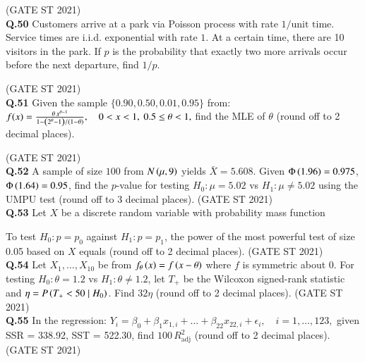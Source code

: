 \documentclass[journal,12pt,onecolumn]{IEEEtran}
\theoremstyle{remark}
\begin{document}
\hfill (GATE ST 2021) \\

\textbf{Q.50}
Customers arrive at a park via Poisson process with rate $1/\text{unit time}$.  
Service times are i.i.d. exponential with rate $1$. At a certain time, there are 10 visitors in the park.  
If $p$ is the probability that exactly two more arrivals occur before the next departure, find $1/p$.

\hfill (GATE ST 2021) \\

\textbf{Q.51}
Given the sample $\{0.90, 0.50, 0.01, 0.95 \}$ from:
$
f(x) = \frac{\theta\, x^{\theta - 1}}{1 - \left(2^{\theta} - 1\right)/\left(1- \theta\right)}, \quad 0 < x < 1, \ 0.5 \le \theta < 1,
$
find the MLE of $\theta$ (round off to 2 decimal places).

\hfill (GATE ST 2021) \\
\textbf{Q.52}
A sample of size $100$ from $N\left(\mu,9\right)$ yields $\bar{X} = 5.608$.  
Given $\Phi\left(1.96\right)= 0.975$, $\Phi\left(1.64\right) = 0.95$,  
find the $p$-value for testing $H_0: \mu = 5.02$ vs $H_1: \mu \neq 5.02$ using the UMPU test  
(round off to 3 decimal places).
\hfill (GATE ST 2021) \\
\textbf{Q.53}
Let $X$ be a discrete random variable with probability mass function

  \bigskip

To test $H_0: p = p_0$ against $H_1: p = p_1$, the power of the most powerful test of size 0.05 based on $X$ equals (round off to 2 decimal places).
\hfill (GATE ST 2021) \\
\textbf{Q.54}
Let $X_1,\dots,X_{10}$ be from $f_\theta\left(x\right) = f\left(x-\theta\right)$ where $f$ is symmetric about $0$.  
For testing $H_0: \theta = 1.2$ vs $H_1: \theta \neq 1.2$,  
let $T_+$ be the Wilcoxon signed-rank statistic and $\eta = P\left(T_+ < 50 \mid H_0\right)$.  
Find $32 \eta$ (round off to 2 decimal places).
\hfill (GATE ST 2021) \\
\textbf{Q.55}
In the regression:
$
Y_i = \beta_0 + \beta_1 x_{1,i} + \dots + \beta_{22} x_{22,i} + \epsilon_i, \quad i=1,\dots,123,
$
given SSR = 338.92, SST = 522.30,  
find $100\, R_{\text{adj}}^2$ (round off to 2 decimal places).
\hfill (GATE ST 2021) \\
\end{document}
